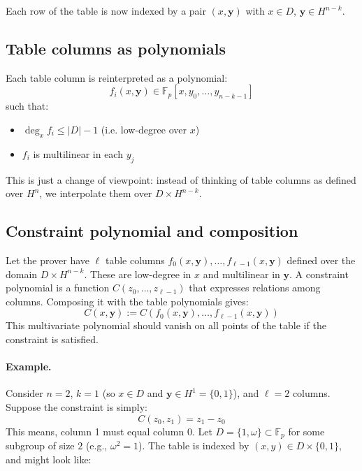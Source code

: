 \documentclass{article}
\newcommand{\Fp}{\mathbb F_p}
\begin{document}
Each row of the table is now indexed by a pair $(x, \mathbf{y})$ with $x \in D$, $\mathbf{y} \in H^{n-k}$.

\subsection{Table columns as polynomials}

Each table column is reinterpreted as a polynomial:
\begin{equation}
f_i(x, \mathbf{y}) \in \Fp[x, y_0, \dots, y_{n-k-1}]
\end{equation}
such that:
\begin{itemize}
    \item $\deg_x f_i \leq |D| - 1$ (i.e. low-degree over $x$)
    \item $f_i$ is multilinear in each $y_j$
\end{itemize}

This is just a change of viewpoint: instead of thinking of table columns as defined over $H^n$, we interpolate them over $D \times H^{n-k}$.




\subsection{Constraint polynomial and composition}

Let the prover have $\ell$ table columns $f_0(x, \mathbf{y}), \dots, f_{\ell-1}(x, \mathbf{y})$ defined over the domain $D \times H^{n-k}$. These are low-degree in $x$ and multilinear in $\mathbf{y}$. A constraint polynomial is a function $C(z_0, \dots, z_{\ell-1})$ that expresses relations among columns. Composing it with the table polynomials gives:
\begin{equation}
C(x, \mathbf{y}) := C(f_0(x, \mathbf{y}), \dots, f_{\ell-1}(x, \mathbf{y}))
\end{equation}
This multivariate polynomial should vanish on all points of the table if the constraint is satisfied.

\paragraph{Example.} Consider $n = 2$, $k = 1$ (so $x \in D$ and $\mathbf{y} \in H^1 = \{0,1\}$), and $\ell = 2$ columns. Suppose the constraint is simply:
\begin{equation}
C(z_0, z_1) = z_1 - z_0
\end{equation}
This means, column 1 must equal column 0. Let $D = \{1, \omega\} \subset \Fp$ for some subgroup of size $2$ (e.g., $\omega^2 = 1$). The table is indexed by $(x, y) \in D \times \{0,1\}$, and might look like:
\end{document}
